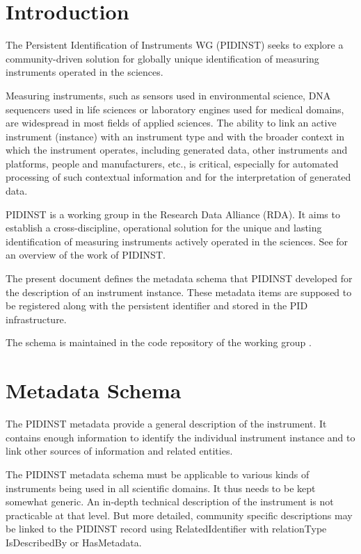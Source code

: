 \documentclass[titlepage=true,twoside=false,DIV=13]{scrartcl}
\begin{document}
\tableofcontents
\cleardoublepage
{}

\section{Introduction}

The Persistent Identification of Instruments WG (PIDINST) seeks to
explore a community-driven solution for globally unique identification
of measuring instruments operated in the sciences.

Measuring instruments, such as sensors used in environmental science,
DNA sequencers used in life sciences or laboratory engines used for
medical domains, are widespread in most fields of applied sciences.
The ability to link an active instrument (instance) with an instrument
type and with the broader context in which the instrument operates,
including generated data, other instruments and platforms, people and
manufacturers, etc., is critical, especially for automated processing
of such contextual information and for the interpretation of generated
data.

PIDINST is a working group in the Research Data Alliance (RDA).  It
aims to establish a cross-discipline, operational solution for the
unique and lasting identification of measuring instruments actively
operated in the sciences.  See \cite{pidinst2020} for an overview of
the work of PIDINST.

The present document defines the metadata schema that PIDINST
developed for the description of an instrument instance.  These
metadata items are supposed to be registered along with the persistent
identifier and stored in the PID infrastructure.

The schema is maintained in the code repository of the working group
\cite{pidinst:github}.

\section{Metadata Schema}

The PIDINST metadata provide a general description of the instrument.
It contains enough information to identify the individual instrument
instance and to link other sources of information and related
entities.

The PIDINST metadata schema must be applicable to various kinds of
instruments being used in all scientific domains.  It thus needs to be
kept somewhat generic.  An in-depth technical description of the
instrument is not practicable at that level.  But more detailed,
community specific descriptions may be linked to the PIDINST record
using RelatedIdentifier with relationType IsDescribedBy or
HasMetadata.
\end{document}
